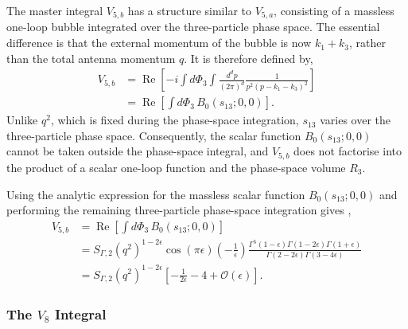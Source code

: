 The master integral $V_{5,b}$ has a structure similar to $V_{5,a}$, consisting of a massless
one-loop bubble integrated over the three-particle phase space. The essential difference is
that the external momentum of the bubble is now $k_1+k_3$, rather than the total antenna
momentum $q$. It is therefore defined by,
\begin{equation}
    \begin{split}
        V_{5,b} &= \operatorname{Re}\!\left[-i\int d\Phi_3\int\frac{d^dp}{(2\pi)^d}\frac1{p^2(p-k_1-k_3)^2}\right]\\
                &= \operatorname{Re}\!\left[\int d\Phi_3\,B_0\!\left(s_{13};0,0\right)\right].
    \end{split}
\end{equation}
Unlike $q^2$, which is fixed during the phase-space integration, $s_{13}$ varies over the
three-particle phase space. Consequently, the scalar function $B_0\!\left(s_{13};0,0\right)$
cannot be taken outside the phase-space integral, and $V_{5,b}$ does not factorise into the
product of a scalar one-loop function and the phase-space volume $R_3$.

Using the analytic expression for the massless scalar function $B_0\!\left(s_{13};0,0\right)$
and performing the remaining three-particle phase-space integration gives
\cite{Gehrmann-DeRidder:2005btv},
\begin{equation}
    \begin{split}
        V_{5,b} &= \operatorname{Re}\!\left[\int d\Phi_3\,B_0\!\left(s_{13};0,0\right)\right]\\
                &= S_{\Gamma,2}\!\left(q^2\right)^{1-2\epsilon}\cos(\pi\epsilon)\!\left(-\frac1\epsilon\right)\frac{\Gamma^5(1-\epsilon)\Gamma(1-2\epsilon)\Gamma(1+\epsilon)}{\Gamma(2-2\epsilon)\Gamma(3-4\epsilon)}\\
                &= S_{\Gamma,2}\!\left(q^2\right)^{1-2\epsilon}\!\left[-\frac1{2\epsilon}-4+\mathcal O(\epsilon)\right].
    \end{split}
\end{equation}

\subsubsection*{The $V_8$ Integral}

